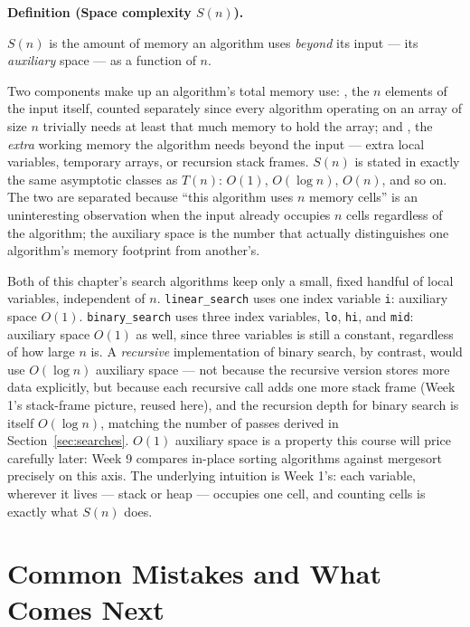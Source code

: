 \documentclass[11pt]{article}
\newenvironment{definitionbox}[1]{%
  \par\noindent\textbf{Definition (#1).}\ \itshape
}{\par\vspace{0.3em}}
\begin{document}
\begin{definitionbox}{Space complexity $S(n)$}
$S(n)$ is the amount of memory an algorithm uses \emph{beyond} its input ---
its \emph{auxiliary} space --- as a function of $n$.
\end{definitionbox}

Two components make up an algorithm's total memory use: ,
the $n$ elements of the input itself, counted separately since every
algorithm operating on an array of size $n$ trivially needs at least that
much memory to hold the array; and , the \emph{extra}
working memory the algorithm needs beyond the input --- extra local
variables, temporary arrays, or recursion stack frames. $S(n)$ is stated in
exactly the same asymptotic classes as $T(n)$: $O(1)$, $O(\log n)$, $O(n)$,
and so on. The two are separated because ``this algorithm uses $n$ memory
cells'' is an uninteresting observation when the input already occupies $n$
cells regardless of the algorithm; the auxiliary space is the number that
actually distinguishes one algorithm's memory footprint from another's.

Both of this chapter's search algorithms keep only a small, fixed handful
of local variables, independent of $n$. \texttt{linear\_search} uses one
index variable \texttt{i}: auxiliary space $O(1)$. \texttt{binary\_search}
uses three index variables, \texttt{lo}, \texttt{hi}, and \texttt{mid}:
auxiliary space $O(1)$ as well, since three variables is still a constant,
regardless of how large $n$ is. A \emph{recursive} implementation of binary
search, by contrast, would use $O(\log n)$ auxiliary space --- not because
the recursive version stores more data explicitly, but because each
recursive call adds one more stack frame (Week 1's stack-frame picture,
reused here), and the recursion depth for binary search is itself $O(\log
n)$, matching the number of passes derived in
Section~\ref{sec:searches}. $O(1)$ auxiliary space is a property this course
will price carefully later: Week 9 compares in-place sorting algorithms
against mergesort precisely on this axis. The underlying intuition is
Week 1's: each variable, wherever it lives --- stack or heap --- occupies
one cell, and counting cells is exactly what $S(n)$ does.

\section{Common Mistakes and What Comes Next}
\label{sec:mistakes}
\end{document}
